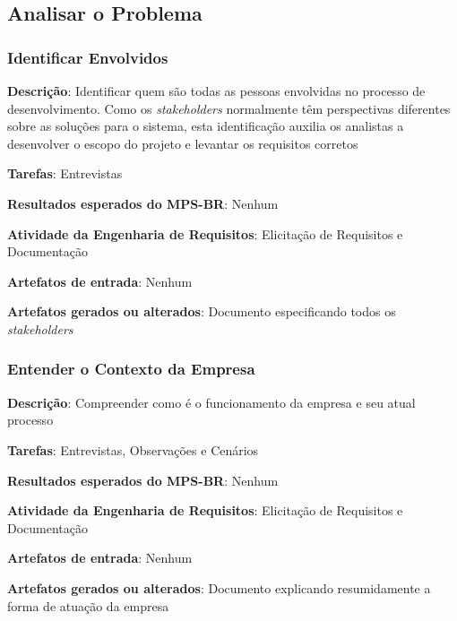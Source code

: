 \subsection{Analisar o Problema}

\subsubsection{Identificar Envolvidos}

\begin{description}
\item\textbf{Descrição}: Identificar quem são todas as pessoas envolvidas no processo de desenvolvimento. Como os \textit{stakeholders} normalmente têm perspectivas diferentes sobre as soluções para o sistema, esta identificação auxilia os analistas a desenvolver o escopo do projeto e levantar os requisitos corretos
\item\textbf{Tarefas}: Entrevistas
\item\textbf{Resultados esperados do MPS-BR}: Nenhum
\item\textbf{Atividade da Engenharia de Requisitos}: Elicitação de Requisitos e Documentação
\item\textbf{Artefatos de entrada}: Nenhum
\item\textbf{Artefatos gerados ou alterados}: Documento especificando todos os \textit{stakeholders}
\end{description}

\subsubsection{Entender o Contexto da Empresa}

\begin{description}
\item\textbf{Descrição}: Compreender como é o funcionamento da empresa e seu atual processo
\item\textbf{Tarefas}: Entrevistas, Observações e Cenários
\item\textbf{Resultados esperados do MPS-BR}: Nenhum
\item\textbf{Atividade da Engenharia de Requisitos}: Elicitação de Requisitos e Documentação
\item\textbf{Artefatos de entrada}: Nenhum
\item\textbf{Artefatos gerados ou alterados}: Documento explicando resumidamente a forma de atuação da empresa
\end{description}

